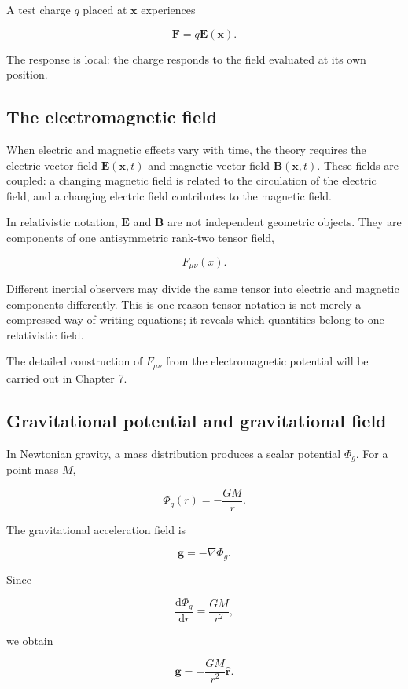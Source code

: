 A test charge \(q\) placed at \(\mathbf{x}\) experiences

\[
\mathbf{F}=q\mathbf{E}(\mathbf{x}).
\]

The response is local: the charge responds to the field evaluated at its own position.

\subsection{The electromagnetic field}

When electric and magnetic effects vary with time, the theory requires the electric vector field \(\mathbf{E}(\mathbf{x},t)\) and magnetic vector field \(\mathbf{B}(\mathbf{x},t)\). These fields are coupled: a changing magnetic field is related to the circulation of the electric field, and a changing electric field contributes to the magnetic field.

In relativistic notation, \(\mathbf{E}\) and \(\mathbf{B}\) are not independent geometric objects. They are components of one antisymmetric rank-two tensor field,

\[
F_{\mu\nu}(x).
\]

Different inertial observers may divide the same tensor into electric and magnetic components differently. This is one reason tensor notation is not merely a compressed way of writing equations; it reveals which quantities belong to one relativistic field.

The detailed construction of \(F_{\mu\nu}\) from the electromagnetic potential will be carried out in Chapter 7.

\subsection{Gravitational potential and gravitational field}

In Newtonian gravity, a mass distribution produces a scalar potential \(\Phi_{g}\). For a point mass \(M\),

\[
\Phi_{g}(r)
=
-\frac{GM}{r}.
\]

The gravitational acceleration field is

\[
\mathbf{g}=-\nabla\Phi_{g}.
\]

Since

\[
\frac{\mathrm{d}\Phi_{g}}{\mathrm{d}r}
=
\frac{GM}{r^{2}},
\]

we obtain

\[
\boxed{
\mathbf{g}
=
-\frac{GM}{r^{2}}
\widehat{\mathbf{r}}
}.
\]

